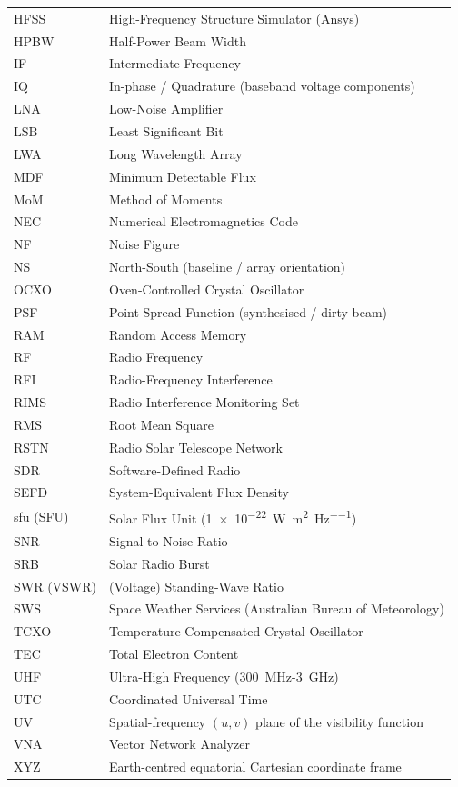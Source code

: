 {\begin{longtable}{@{} p{3.2cm} p{12.3cm} @{}}
HFSS     & High-Frequency Structure Simulator (Ansys) \\
HPBW     & Half-Power Beam Width \\
IF       & Intermediate Frequency \\
IQ       & In-phase / Quadrature (baseband voltage components) \\
LNA      & Low-Noise Amplifier \\
LSB      & Least Significant Bit \\
LWA      & Long Wavelength Array \\
MDF      & Minimum Detectable Flux \\
MoM      & Method of Moments \\
NEC      & Numerical Electromagnetics Code \\
NF       & Noise Figure \\
NS       & North-South (baseline / array orientation) \\
OCXO     & Oven-Controlled Crystal Oscillator \\
PSF      & Point-Spread Function (synthesised / dirty beam) \\
RAM      & Random Access Memory \\
RF       & Radio Frequency \\
RFI      & Radio-Frequency Interference \\
RIMS     & Radio Interference Monitoring Set \\
RMS      & Root Mean Square \\
RSTN     & Radio Solar Telescope Network \\
SDR      & Software-Defined Radio \\
SEFD     & System-Equivalent Flux Density \\
sfu (SFU) & Solar Flux Unit (\SI{1e-22}{\watt\per\square\metre\per\hertz}) \\
SNR      & Signal-to-Noise Ratio \\
SRB      & Solar Radio Burst \\
SWR (VSWR) & (Voltage) Standing-Wave Ratio \\
SWS      & Space Weather Services (Australian Bureau of Meteorology) \\
TCXO     & Temperature-Compensated Crystal Oscillator \\
TEC      & Total Electron Content \\
UHF      & Ultra-High Frequency (\SI{300}{\mega\hertz}-\SI{3}{\giga\hertz}) \\
UTC      & Coordinated Universal Time \\
UV       & Spatial-frequency $(u,v)$ plane of the visibility function \\
VNA      & Vector Network Analyzer \\
XYZ      & Earth-centred equatorial Cartesian coordinate frame \\
\end{longtable}
} %
\clearpage
